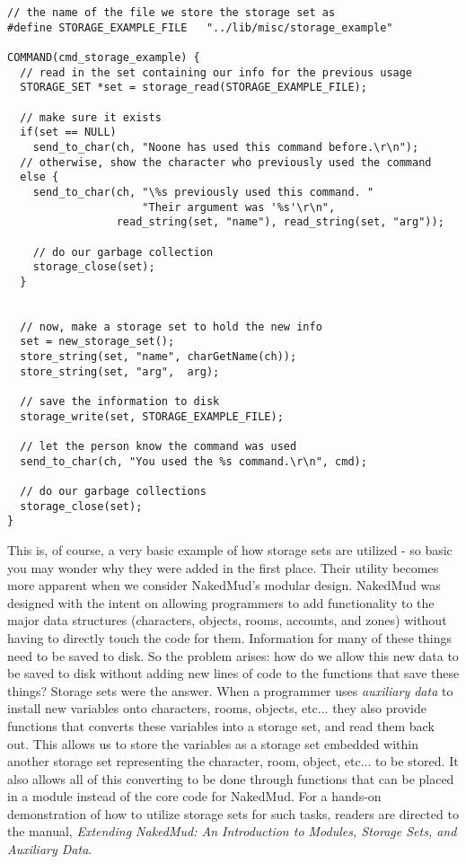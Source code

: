 \documentclass[fignum,doc]{article}
\begin{document}
\begin{doublespace}
\begin{singlespace}\begin{verbatim}
// the name of the file we store the storage set as
#define STORAGE_EXAMPLE_FILE   "../lib/misc/storage_example"

COMMAND(cmd_storage_example) {
  // read in the set containing our info for the previous usage
  STORAGE_SET *set = storage_read(STORAGE_EXAMPLE_FILE);
  
  // make sure it exists
  if(set == NULL)
    send_to_char(ch, "Noone has used this command before.\r\n");
  // otherwise, show the character who previously used the command
  else {
    send_to_char(ch, "\%s previously used this command. "
                     "Their argument was '%s'\r\n",
                 read_string(set, "name"), read_string(set, "arg"));
    
    // do our garbage collection
    storage_close(set);
  }
  
  
  // now, make a storage set to hold the new info
  set = new_storage_set();
  store_string(set, "name", charGetName(ch));
  store_string(set, "arg",  arg);
  
  // save the information to disk
  storage_write(set, STORAGE_EXAMPLE_FILE);
  
  // let the person know the command was used
  send_to_char(ch, "You used the %s command.\r\n", cmd);
  
  // do our garbage collections
  storage_close(set);  
}
\end{verbatim}\end{singlespace}

\noindent This is, of course, a very basic example of how storage sets are utilized - so basic you may wonder why they were added in the first place. Their utility becomes more apparent when we consider NakedMud's modular design. NakedMud was designed with the intent on allowing programmers to add functionality to the major data structures (characters, objects, rooms, accounts, and zones) without having to directly touch the code for them. Information for many of these things need to be saved to disk. So the problem arises: how do we allow this new data to be saved to disk without adding new lines of code to the functions that save these things? Storage sets were the answer. When a programmer uses {\it auxiliary data} to install new variables onto characters, rooms, objects, etc... they also provide functions that converts these variables into a storage set, and read them back out. This allows us to store the variables as a storage set embedded within another storage set representing the character, room, object, etc... to be stored. It also allows all of this converting to be done through functions that can be placed in a module instead of the core code for NakedMud. For a hands-on demonstration of how to utilize storage sets for such tasks, readers are directed to the manual, {\it Extending NakedMud: An Introduction to Modules, Storage Sets, and Auxiliary Data}.




\end{doublespace}
\end{document}
